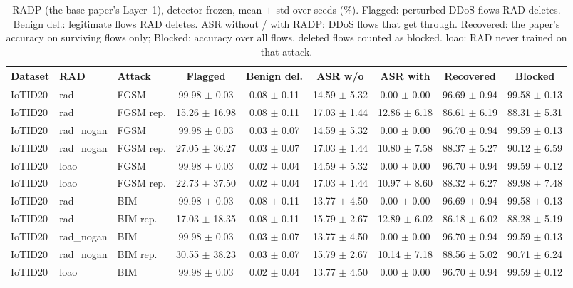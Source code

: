 \begin{table}[t]
\centering
\caption{RADP (the base paper's Layer~1), detector frozen, mean $\pm$ std over seeds (\%). Flagged: perturbed DDoS flows RAD deletes. Benign del.: legitimate flows RAD deletes. ASR without / with RADP: DDoS flows that get through. Recovered: the paper's accuracy on surviving flows only; Blocked: accuracy over all flows, deleted flows counted as blocked. loao: RAD never trained on that attack.}
\label{tab:radp}
\footnotesize
\setlength{\tabcolsep}{3pt}
\begin{tabular}{lllcccccc}
\toprule
Dataset & RAD & Attack & Flagged & Benign del. & ASR w/o & ASR with & Recovered & Blocked \\
\midrule
IoTID20 & rad & FGSM & 99.98 $\pm$ 0.03 & 0.08 $\pm$ 0.11 & 14.59 $\pm$ 5.32 & 0.00 $\pm$ 0.00 & 96.69 $\pm$ 0.94 & 99.58 $\pm$ 0.13 \\
IoTID20 & rad & FGSM rep. & 15.26 $\pm$ 16.98 & 0.08 $\pm$ 0.11 & 17.03 $\pm$ 1.44 & 12.86 $\pm$ 6.18 & 86.61 $\pm$ 6.19 & 88.31 $\pm$ 5.31 \\
IoTID20 & rad\_nogan & FGSM & 99.98 $\pm$ 0.03 & 0.03 $\pm$ 0.07 & 14.59 $\pm$ 5.32 & 0.00 $\pm$ 0.00 & 96.70 $\pm$ 0.94 & 99.59 $\pm$ 0.13 \\
IoTID20 & rad\_nogan & FGSM rep. & 27.05 $\pm$ 36.27 & 0.03 $\pm$ 0.07 & 17.03 $\pm$ 1.44 & 10.80 $\pm$ 7.58 & 88.37 $\pm$ 5.27 & 90.12 $\pm$ 6.59 \\
IoTID20 & loao & FGSM & 99.98 $\pm$ 0.03 & 0.02 $\pm$ 0.04 & 14.59 $\pm$ 5.32 & 0.00 $\pm$ 0.00 & 96.70 $\pm$ 0.94 & 99.59 $\pm$ 0.12 \\
IoTID20 & loao & FGSM rep. & 22.73 $\pm$ 37.50 & 0.02 $\pm$ 0.04 & 17.03 $\pm$ 1.44 & 10.97 $\pm$ 8.60 & 88.32 $\pm$ 6.27 & 89.98 $\pm$ 7.48 \\
IoTID20 & rad & BIM & 99.98 $\pm$ 0.03 & 0.08 $\pm$ 0.11 & 13.77 $\pm$ 4.50 & 0.00 $\pm$ 0.00 & 96.69 $\pm$ 0.94 & 99.58 $\pm$ 0.13 \\
IoTID20 & rad & BIM rep. & 17.03 $\pm$ 18.35 & 0.08 $\pm$ 0.11 & 15.79 $\pm$ 2.67 & 12.89 $\pm$ 6.02 & 86.18 $\pm$ 6.02 & 88.28 $\pm$ 5.19 \\
IoTID20 & rad\_nogan & BIM & 99.98 $\pm$ 0.03 & 0.03 $\pm$ 0.07 & 13.77 $\pm$ 4.50 & 0.00 $\pm$ 0.00 & 96.70 $\pm$ 0.94 & 99.59 $\pm$ 0.13 \\
IoTID20 & rad\_nogan & BIM rep. & 30.55 $\pm$ 38.23 & 0.03 $\pm$ 0.07 & 15.79 $\pm$ 2.67 & 10.14 $\pm$ 7.18 & 88.56 $\pm$ 5.02 & 90.71 $\pm$ 6.24 \\
IoTID20 & loao & BIM & 99.98 $\pm$ 0.03 & 0.02 $\pm$ 0.04 & 13.77 $\pm$ 4.50 & 0.00 $\pm$ 0.00 & 96.70 $\pm$ 0.94 & 99.59 $\pm$ 0.12 \\

\end{tabular}
\end{table}

